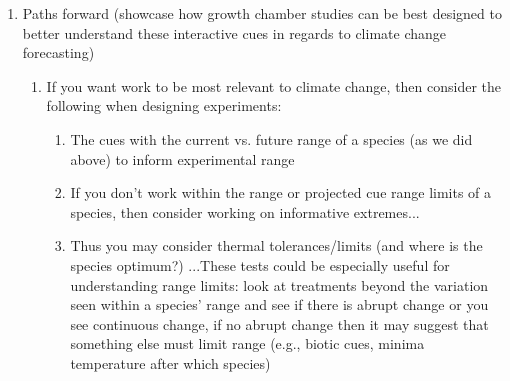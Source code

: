 \documentclass[11pt,letterpaper]{article}
\begin{document}
\begin{enumerate}
\begin{enumerate}
\begin{enumerate}
\begin{enumerate}
\item Max daily temp for 1-2 months before leafout (Nacho's figures) \footnote{We used daily min/max, as they're most directly comparable to OSPREE.}
\end{enumerate}
\item Add potential PhenoFit figure here? 3D of all three cues and how they shifted?
\end{enumerate}
\end{enumerate}
\item Paths forward (showcase how growth chamber studies can be best designed to better understand these interactive cues in regards to climate change forecasting) 
\begin{enumerate}
\item If you want work to be most relevant to climate change, then consider the following when designing experiments:
\begin{enumerate}
\item The cues with the current vs. future range of a species (as we did above) to inform experimental range %
\item If you don't work within the range or projected cue range limits of a species, then consider working on informative extremes... %
\item Thus you may consider thermal tolerances/limits (and where is the species optimum?) ...These tests could be especially useful for understanding range limits: look at treatments beyond the variation seen within a species' range and see if there is abrupt change or you see continuous change, if no abrupt change then it may suggest that something else must limit range (e.g., biotic cues, minima temperature after which species) 

\end{enumerate}
\end{enumerate}
\end{enumerate}
\end{document}

